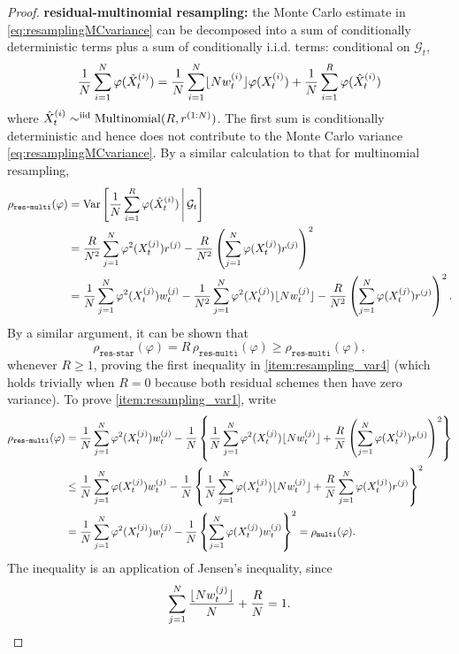 \begin{proof}
\textbf{residual-multinomial resampling:} the Monte Carlo estimate in \eqref{eq:resamplingMCvariance} can be decomposed into a sum of conditionally deterministic terms plus a sum of conditionally i.i.d. terms: conditional on $\mathcal{G}_t$,
\begin{equation*}
\frac{1}{N} \sum_{i=1}^N \varphi (\tilde{X}_t^{(i)})
= \frac{1}{N} \sum_{i=1}^N \flnw \varphi (X_t^{(i)})
        + \frac{1}{N} \sum_{i=1}^R \varphi (\hat{X}_t^{(i)})
\end{equation*}
where
$ \hat{X}_t^{(i)} \sim^{\text{iid}} \Mn( R, r^{(1:N)} ) $.
The first sum is conditionally deterministic and hence does not contribute to the Monte Carlo variance \eqref{eq:resamplingMCvariance}. By a similar calculation to that for multinomial resampling,
\begin{align*}
\rho_{\texttt{res-multi}}(\varphi)
&= \V\left[ \frac{1}{N} \sum_{i=1}^R \varphi (\hat{X}_t^{(i)}) 
        \midd \mathcal{G}_t \right] \\
&= \frac{R}{N^2} \sum_{j=1}^N \varphi^2(X_t^{(j)}) r^{(j)}
        - \frac{R}{N^2} \left( \sum_{j=1}^N \varphi(X_t^{(j)}) r^{(j)} \right)^2 \\
&= \frac{1}{N} \sum_{j=1}^N \varphi^2(X_t^{(j)}) w_t^{(j)}
        - \frac{1}{N^2} \sum_{j=1}^N \varphi^2(X_t^{(j)}) \flnw[j]
        - \frac{R}{N^2} \left( \sum_{j=1}^N \varphi(X_t^{(j)}) r^{(j)} \right)^2 . 
\end{align*}
By a similar argument, it can be shown that
\begin{equation*}
\rho_{\texttt{res-star}}(\varphi)
= R \,\rho_{\texttt{res-multi}}(\varphi)
\geq \rho_{\texttt{res-multi}}(\varphi) ,
\end{equation*}
whenever $R\geq 1$, proving the first inequality in \ref{item:resampling_var4} (which holds trivially when $R=0$ because both residual schemes then have zero variance). 
To prove \ref{item:resampling_var1}, write
\begin{align*}
\rho_{\texttt{res-multi}}(\varphi)
&= \frac{1}{N} \sum_{j=1}^N \varphi^2(X_t^{(j)}) w_t^{(j)}
        - \frac{1}{N} \left\{ \frac{1}{N} \sum_{j=1}^N \varphi^2(X_t^{(j)}) \flnw[j]
        + \frac{R}{N} \left( \sum_{j=1}^N \varphi(X_t^{(j)}) r^{(j)} \right)^2
        \right\} \\
&\leq \frac{1}{N} \sum_{j=1}^N \varphi(X_t^{(j)}) w_t^{(j)}
        - \frac{1}{N} \left\{ \frac{1}{N} \sum_{j=1}^N \varphi(X_t^{(j)}) \flnw[j]
        + \frac{R}{N} \sum_{j=1}^N \varphi(X_t^{(j)}) r^{(j)}
        \right\}^2 \\
&= \frac{1}{N} \sum_{j=1}^N \varphi^2(X_t^{(j)}) w_t^{(j)}
        - \frac{1}{N} \left\{ \sum_{j=1}^N \varphi(X_t^{(j)}) w_t^{(j)} \right\}^2
        = \rho_{\texttt{multi}}(\varphi) .
\end{align*}
The inequality is an application of Jensen's inequality, since
\begin{equation*}
\sum_{j=1}^N \frac{ \flnw[j] }{N} + \frac{R}{N} = 1 .
\end{equation*}




\end{proof}
